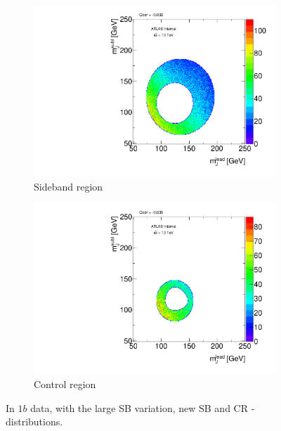 \begin{figure}[htbp!]
\centering
\captionsetup{justification=centering}
    \begin{subfigure}[b]{0.39\textwidth}
        \includegraphics[width=\textwidth,angle=-90]{figures/boosted/Syst_CRSB/SB_Large_Sideband_OneTag_mH0H1.pdf}
        \caption{Sideband region}
        \label{CRSB:SB_Large_SB}
    \end{subfigure}
    \quad
    \begin{subfigure}[b]{0.39\textwidth}
        \includegraphics[width=\textwidth,angle=-90]{figures/boosted/Syst_CRSB/SB_Large_Control_OneTag_mH0H1.pdf}
        \caption{Control region}
        \label{CRSB:SB_Large_CR}
    \end{subfigure}
\caption{In $1b$ data, with the large SB variation, new SB and CR \mleadJ-\msublJ~ distributions.}
\label{CRSB:SB_Large}
\end{figure}


